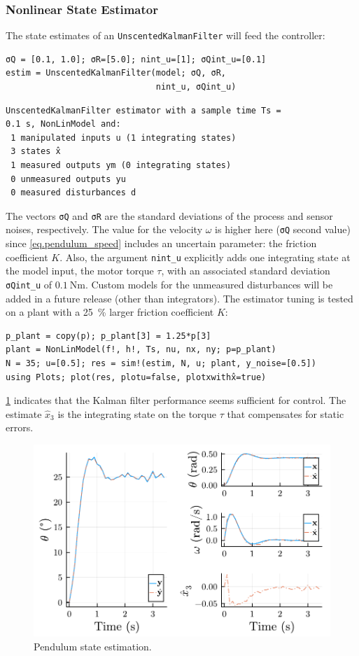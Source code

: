 \subsubsection{Nonlinear State Estimator}

The state estimates of an \texttt{UnscentedKalmanFilter} will feed the controller:
\begin{verbatim}
σQ = [0.1, 1.0]; σR=[5.0]; nint_u=[1]; σQint_u=[0.1]
estim = UnscentedKalmanFilter(model; σQ, σR, 
                              nint_u, σQint_u)
\end{verbatim}
\spacerepl
\begin{verbatim}
UnscentedKalmanFilter estimator with a sample time Ts =
0.1 s, NonLinModel and:
 1 manipulated inputs u (1 integrating states)
 3 states x̂
 1 measured outputs ym (0 integrating states)
 0 unmeasured outputs yu
 0 measured disturbances d
\end{verbatim}
The vectors \texttt{σQ} and \texttt{σR} are the standard deviations of the process and sensor noises, respectively. The value for the velocity $\omega$ is higher here (\texttt{σQ} second value) since \eqref{eq.pendulum_speed} includes an uncertain parameter: the friction coefficient $K$. Also, the argument \texttt{nint\_u} explicitly adds one integrating state at the model input, the motor torque $\tau$, with an associated standard deviation \texttt{σQint\_u} of $\SI{0.1}{\newton\meter}$. Custom models for the unmeasured disturbances will be added in a future release (other than integrators). The estimator tuning is tested on a plant with a \SI{25}{\percent} larger friction coefficient $K$: 
\begin{verbatim}
p_plant = copy(p); p_plant[3] = 1.25*p[3]
plant = NonLinModel(f!, h!, Ts, nu, nx, ny; p=p_plant)
N = 35; u=[0.5]; res = sim!(estim, N, u; plant, y_noise=[0.5])
using Plots; plot(res, plotu=false, plotxwithx̂=true)
\end{verbatim}
\cref{fig:plot_NonLinMPC1} indicates that the Kalman filter performance seems sufficient for control. The estimate $\hat{x}_3$ is the integrating state on the torque $\tau$ that compensates for static errors. 

\begin{figure}[ht]
    \centering
    \includegraphics[width=\columnwidth]{fig/plot_NonLinMPC1.pdf}
    \caption{Pendulum state estimation.}\label{fig:plot_NonLinMPC1}
\end{figure}

